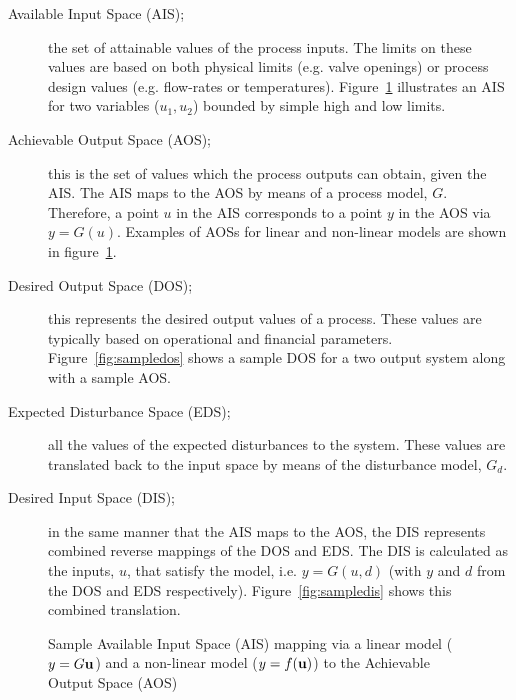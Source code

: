 \begin{description}
  \item [Available Input Space (AIS);] the set of attainable values of the process inputs. 
    The limits on these values are based on both physical limits (e.g.     valve openings) or process design values (e.g. flow-rates or temperatures). 
Figure~\ref{fig:sampleaisaos} illustrates an AIS for two variables ($u_1, u_2$) bounded by simple high and low limits.%
%
  \item [Achievable Output Space (AOS);] this is the set of values which the process outputs can obtain, given the AIS. 
The AIS maps to the AOS by means of a process model, $G$. 
Therefore, a point $u$ in the AIS corresponds to a point $y$ in the AOS via $y=G(u)$. 
Examples of AOSs for linear and non-linear models are shown in figure~\ref{fig:sampleaisaos}.%
%
%
  \item [Desired Output Space (DOS);] this represents the desired output values of a process. 
These values are typically based on operational and financial   parameters. 
Figure~\ref{fig:sampledos} shows a sample DOS for a two output    system along with a sample AOS.%
%
  \item [Expected Disturbance Space (EDS);] all the values of the expected disturbances to the system. 
These values are translated back to the input space by means of the disturbance model, $G_d$.%
%
  \item [Desired Input Space (DIS);] in the same manner that the AIS maps to the AOS, the DIS represents combined reverse mappings of the DOS and EDS.
The DIS is calculated as the inputs, $u$, that satisfy the model, i.e. $y=G(u,d)$ (with $y$ and $d$ from the DOS and EDS respectively).
Figure~\ref{fig:sampledis} shows this combined translation.%
%
%
\end{description}

\begin{figure}[htbp]
  \centering
  \scalebox{1}{}
  \caption[Sample Available Input Space mapping to Achievable Output Space]{Sample Available Input Space (AIS) mapping via a linear model ($y=G{\bf {u}}$) and a non-linear model ($y=f({\bf {u}})$) to the Achievable Output Space (AOS)}
  \label{fig:sampleaisaos}
\end{figure}

